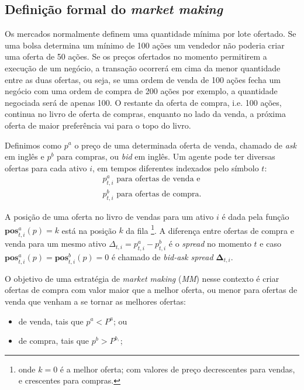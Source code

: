 \subsection{Definição formal do \textit{market making}}

Os mercados normalmente definem uma quantidade mínima por lote ofertado. Se uma bolsa determina um mínimo de 100 ações um vendedor não poderia criar uma oferta de 50 ações. Se os preços ofertados no momento permitirem a execução de um negócio, a transação ocorrerá em cima da menor quantidade entre as duas ofertas, ou seja, se uma ordem de venda de 100 ações fecha um negócio com uma ordem de compra de 200 ações por exemplo, a quantidade negociada será de apenas 100. O restante da oferta de compra, i.e. 100 ações, continua no livro de oferta de compras, enquanto no lado da venda, a próxima oferta de maior preferência vai para o topo do livro. 

Definimos como $p^{a}$ o preço de uma determinada oferta de venda, chamado de \textit{ask} em inglês e $p^{b}$ para compras, ou \textit{bid} em inglês. Um agente pode ter diversas ofertas para cada ativo $i$, em tempos diferentes indexados pelo símbolo $t$: 
\begin{equation*}
	\begin{aligned}
		p^{a}_{t, i} \text{ para ofertas de venda e}  \\
		p^{b}_{t, i} \text{ para ofertas de compra.}
	\end{aligned}
\end{equation*}

A posição de uma oferta no livro de vendas para um ativo $i$ é dada pela função $\mathbf{pos}_{t, i}^{a}(p) = k$ está na posição $k$ da fila \footnote{onde $k = 0$ é a melhor oferta; com valores de preço decrescentes para vendas, e crescentes para compras.}. A diferença entre ofertas de compra e venda para um mesmo ativo $\Delta_{t, i} = p_{t, i}^{a} - p_{t, i}^{b}$ é o \textit{spread} no momento $t$ e caso $\mathbf{pos}_{t, i}^{a}(p) = \mathbf{pos}_{t, i}^{b}(p) = 0$ é chamado de \textit{bid-ask spread} $\mathbf{\Delta}_{t, i}$.

O objetivo de uma estratégia de \textit{market making} (\textit{MM}) nesse contexto é criar ofertas de compra com valor maior que a melhor oferta, ou menor para ofertas de venda que venham a se tornar as melhores ofertas:

\begin{itemize}
    \item de venda, tais que $p^{a} < P^{a}$; ou 
    \item de compra, tais que $p^{b} > P^{b,}$;
\end{itemize}

